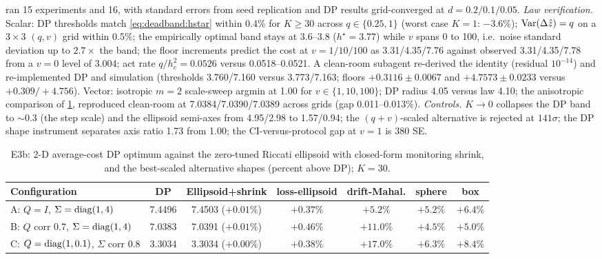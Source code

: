  ran 15 experiments and  16, with standard errors from seed replication and DP results grid-converged at $d = 0.2/0.1/0.05$. \emph{Law verification.} Scalar: DP thresholds match \cref{eq:deadband:hstar} within 0.4\% for $K \ge 30$ across $q \in \{0.25, 1\}$ (worst case $K = 1$: $-3.6\%$); $\operatorname{Var}(\Delta\hat z) = q$ on a $3\times3$ $(q,v)$ grid within 0.5\%; the empirically optimal band stays at 3.6--3.8 ($h^\star = 3.77$) while $v$ spans 0 to 100, i.e.\ noise standard deviation up to $2.7\times$ the band; the floor increments predict the cost at $v = 1/10/100$ as 3.31/4.35/7.76 against observed 3.31/4.35/7.78 from a $v = 0$ level of 3.004; act rate $q/h_c^2 = 0.0526$ versus 0.0518--0.0521. A clean-room subagent re-derived the identity (residual $10^{-14}$) and re-implemented DP and simulation (thresholds 3.760/7.160 versus 3.773/7.163; floors $+0.3116 \pm 0.0067$ and $+4.7573 \pm 0.0233$ versus $+0.309/+4.756$). Vector: isotropic $m = 2$ scale-sweep argmin at 1.00 for $v \in \{1, 10, 100\}$; DP radius 4.05 versus law 4.10; the anisotropic comparison of \cref{deadband:tab:dp}, reproduced clean-room at 7.0384/7.0390/7.0389 across grids (gap 0.011--0.013\%). \emph{Controls.} $K \to 0$ collapses the DP band to $\sim$0.3 (the step scale) and the ellipsoid semi-axes from 4.95/2.98 to 1.57/0.94; the $(q+v)$-scaled alternative is rejected at $141\sigma$; the DP shape instrument separates axis ratio 1.73 from 1.00; the CI-versus-protocol gap at $v = 1$ is 380 SE.

\begin{table}[htbp]
\centering\small
\caption{ E3b: 2-D average-cost DP optimum against the zero-tuned Riccati ellipsoid with closed-form monitoring shrink, and the best-scaled alternative shapes (percent above DP); $K = 30$.}
\label{deadband:tab:dp}
\begin{tabular}{lcccccc}
\toprule
Configuration & DP & Ellipsoid+shrink & loss-ellipsoid & drift-Mahal. & sphere & box \\
\midrule
A: $Q = I$, $\Sigma = \operatorname{diag}(1,4)$ & 7.4496 & 7.4503 ($+0.01\%$) & $+0.37\%$ & $+5.2\%$ & $+5.2\%$ & $+6.4\%$ \\
B: $Q$ corr 0.7, $\Sigma = \operatorname{diag}(1,4)$ & 7.0383 & 7.0391 ($+0.01\%$) & $+0.46\%$ & $+11.0\%$ & $+4.5\%$ & $+5.0\%$ \\
C: $Q = \operatorname{diag}(1, 0.1)$, $\Sigma$ corr 0.8 & 3.3034 & 3.3034 ($+0.00\%$) & $+0.38\%$ & $+17.0\%$ & $+6.3\%$ & $+8.4\%$ \\
\bottomrule
\end{tabular}
\end{table}

